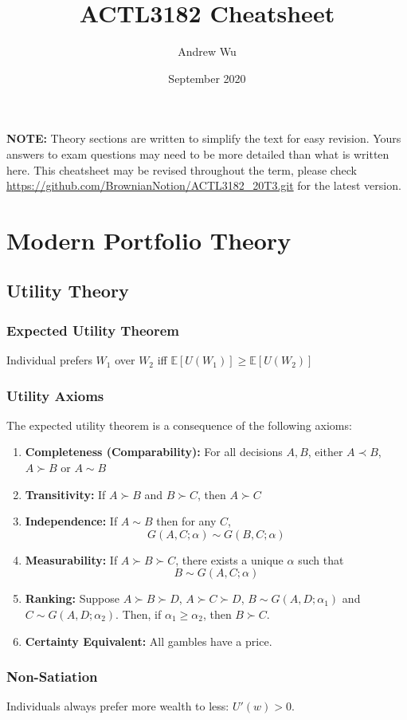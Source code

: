 \documentclass[11pt]{article}
\title{\textbf{ACTL3182 Cheatsheet}}
\author{Andrew Wu}
\date{September 2020}
\newcommand{\E}{\mathbb{E}}
\begin{document}
	\maketitle
	\textbf{NOTE:} Theory sections are written to simplify the text for easy revision. Yours answers to exam questions may need to be more detailed than what is written here. This cheatsheet may be revised throughout the term, please check \url{https://github.com/BrownianNotion/ACTL3182_20T3.git} for the latest version.
	\section{Modern Portfolio Theory}
	\subsection{Utility Theory}
	\subsubsection{Expected Utility Theorem}
	Individual prefers \( W_1 \) over \( W_2 \) iff \( \E[U(W_1)] \geq \E[U(W_2)] \)
	\subsubsection{Utility Axioms}
	The expected utility theorem is a consequence of the following axioms:
	\begin{enumerate}
		\item \textbf{Completeness (Comparability):} For all decisions \( A,B \), either \( A \prec B \), \( A\succ B \) or \( A\sim B \)
		\item \textbf{Transitivity:} If \( A\succ B \) and \( B\succ C \), then \( A\succ C \)
		\item \textbf{Independence:} If \( A\sim B \) then for any \( C \), 
		\[	G(A,C;\alpha) \sim G(B, C; \alpha)\]
		\item \textbf{Measurability:} If \( A\succ B\succ C \), there exists a unique \( \alpha \) such that
		\[ B\sim G(A, C;\alpha)	\]
		\item \textbf{Ranking:} Suppose \( A\succ B\succ D \), \( A\succ C\succ D \), \( B\sim G(A, D;\alpha_1) \) and \( C\sim G(A, D; \alpha_2) \). Then, if \( \alpha_1\geq\alpha_2 \), then \( B\succ C \).
		\item \textbf{Certainty Equivalent:} All gambles have a price.
	\end{enumerate}
	\subsubsection{Non-Satiation}
	Individuals always prefer more wealth to less: \( U'(w) > 0 \).
\end{document}
